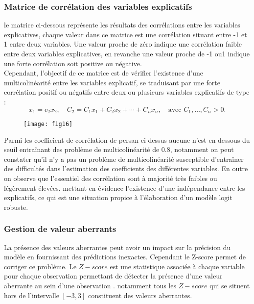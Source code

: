 \documentclass[a4paper]{article}
\begin{document}
 \subsubsection{Matrice de corrélation des variables explicatifs}
 
 le matrice ci-dessous représente les résultats des corrélations entre les variables explicatives, chaque valeur dans ce matrice est une corrélation situant entre -1 et 1 entre deux variables. Une valeur proche de zéro indique une corrélation faible entre deux variables explicatives, en revanche une valeur proche de -1 ou1 indique une forte corrélation soit positive ou négative.\\
 
 Cependant, l'objectif de ce matrice est de vérifier l’existence d’une multicolinéarité entre les variables explicatif, se traduisant par une forte corrélation positif ou négatifs entre deux ou plusieurs variables explicatifs de type :
 	\begin{equation*}
 		x_1 = c_2 x_2, \quad C_2 = C_1 x_1 + C_2 x_2 + \cdots + C_n x_n, \quad \text{avec } C_1, \ldots, C_n > 0.
 	\end{equation*}
 
 
\begin{figure}[h!]
	\centering
	\texttt{[image: fig16]}
	\caption{}
	\label{fig:fig16}
\end{figure}

Parmi les coefficient de corrélation de persan ci-dessus aucune n’est en dessous du seuil entraînant des problème de multicolinéarité de 0.8, notamment on peut constater qu’il n'y a pas un problème de multicolinéarité susceptible d'entraîner des difficultés dans l’estimation des coefficients des différentes variables. En outre on observe que l’essentiel des corrélation sont à majorité très faibles ou légèrement élevées. mettant en évidence l’existence d’une indépendance entre les explicatifs, ce qui est une situation propice à l'élaboration d’un modèle logit robuste.

\subsubsection{Gestion de valeur aberrants}

La présence des valeurs aberrantes peut avoir un impact sur la précision du modèle en fournissant des prédictions inexactes. Cependant le Z-score  permet de corriger ce problème.
Le $Z-score$ est une statistique associée à chaque variable pour chaque  observation permettant de détecter la présence d’une valeur aberrante au sein d’une observation . notamment tous les  $Z-score$ qui se situent hors de  l’intervalle $[-3 , 3 ]$ constituent des valeurs aberrantes.\\
\end{document}
